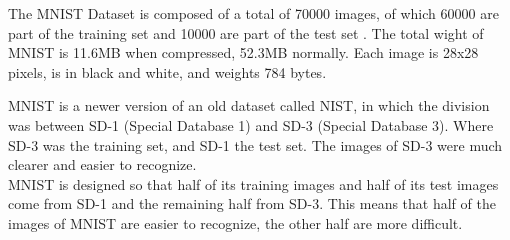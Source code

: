 The MNIST Dataset is composed of a total of 70000 images, of which 60000 are part of the training set and 10000 are part of the test set \cite{MNIST}.
The total wight of MNIST is 11.6MB when compressed, 52.3MB normally. Each image is 28x28 pixels, is in black and white, and weights 784 bytes.

MNIST is a newer version of an old dataset called NIST, in which the division was between SD-1 (Special Database 1) and SD-3 (Special Database 3). Where SD-3 was the training set, and SD-1 the test set. The images of SD-3 were much clearer and easier to recognize.
\\[0.3cm]MNIST is designed so that half of its training images and half of its test images come from SD-1 and the remaining half from SD-3.
This means that half of the images of MNIST are easier to recognize, the other half are more difficult.

